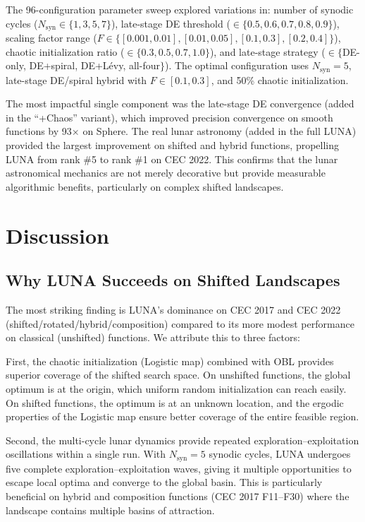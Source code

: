 \documentclass[11pt,a4paper]{article}
\begin{document}
The 96-configuration parameter sweep explored variations in: number of synodic cycles ($N_{\text{syn}} \in \{1, 3, 5, 7\}$), late-stage DE threshold ($\in \{0.5, 0.6, 0.7, 0.8, 0.9\}$), scaling factor range ($F \in \{[0.001, 0.01], [0.01, 0.05], [0.1, 0.3], [0.2, 0.4]\}$), chaotic initialization ratio ($\in \{0.3, 0.5, 0.7, 1.0\}$), and late-stage strategy ($\in \{$DE-only, DE+spiral, DE+L\'evy, all-four$\}$). The optimal configuration uses $N_{\text{syn}}=5$, late-stage DE/spiral hybrid with $F \in [0.1, 0.3]$, and 50\% chaotic initialization.

The most impactful single component was the late-stage DE convergence (added in the ``+Chaos'' variant), which improved precision convergence on smooth functions by 93$\times$ on Sphere. The real lunar astronomy (added in the full LUNA) provided the largest improvement on shifted and hybrid functions, propelling LUNA from rank \#5 to rank \#1 on CEC 2022. This confirms that the lunar astronomical mechanics are not merely decorative but provide measurable algorithmic benefits, particularly on complex shifted landscapes.

\section{Discussion}\label{sec:discussion}

\subsection{Why LUNA Succeeds on Shifted Landscapes}

The most striking finding is LUNA's dominance on CEC 2017 and CEC 2022 (shifted/rotated/hybrid/composition) compared to its more modest performance on classical (unshifted) functions. We attribute this to three factors:

First, the chaotic initialization (Logistic map) combined with OBL provides superior coverage of the shifted search space. On unshifted functions, the global optimum is at the origin, which uniform random initialization can reach easily. On shifted functions, the optimum is at an unknown location, and the ergodic properties of the Logistic map ensure better coverage of the entire feasible region.

Second, the multi-cycle lunar dynamics provide repeated exploration--exploitation oscillations within a single run. With $N_{\text{syn}}=5$ synodic cycles, LUNA undergoes five complete exploration--exploitation waves, giving it multiple opportunities to escape local optima and converge to the global basin. This is particularly beneficial on hybrid and composition functions (CEC 2017 F11--F30) where the landscape contains multiple basins of attraction.
\end{document}
